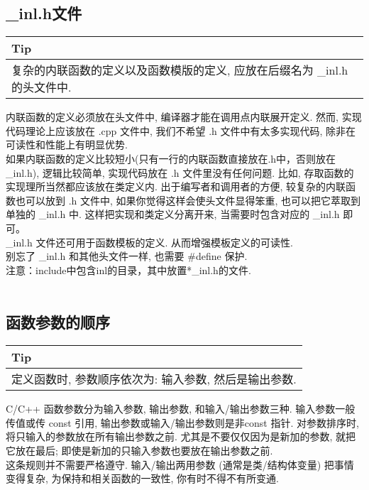 \documentclass[a4paper,11pt,CJK]{article}
\begin{document}
\begin{CJK}{UTF8}{gbsn}
\subsection{\_inl.h文件}
\begin{table}[htbp]
\flushleft
\begin{tabular}{p{400pt}}
\toprule
\rowcolor[gray]{.8} Tip \\
\midrule
复杂的内联函数的定义以及函数模版的定义, 应放在后缀名为 \_inl.h 的头文件中. \\
\bottomrule
\end{tabular}
\end{table}
内联函数的定义必须放在头文件中, 编译器才能在调用点内联展开定义. 然而, 实现代码理论上应该放在 .cpp 文件中, 我们不希望 .h 文件中有太多实现代码, 除非在可读性和性能上有明显优势. \\
\indent 如果内联函数的定义比较短小(只有一行的内联函数直接放在.h中，否则放在\_inl.h), 逻辑比较简单, 实现代码放在 .h 文件里没有任何问题. 比如, 存取函数的实现理所当然都应该放在类定义内. 出于编写者和调用者的方便, 较复杂的内联函数也可以放到 .h 文件中, 如果你觉得这样会使头文件显得笨重, 也可以把它萃取到单独的 \_inl.h 中. 这样把实现和类定义分离开来, 当需要时包含对应的 \_inl.h 即可。\\
\indent \_inl.h 文件还可用于函数模板的定义. 从而增强模板定义的可读性. \\
\indent 别忘了 \_inl.h 和其他头文件一样, 也需要 \#define 保护. \\
\indent 注意：include中包含inl的目录，其中放置*\_inl.h的文件.
\\
\\
\subsection{函数参数的顺序}
\begin{table}[htbp]
\flushleft
\begin{tabular}{p{400pt}}
\toprule
\rowcolor[gray]{.8} Tip \\
\midrule
定义函数时, 参数顺序依次为: 输入参数, 然后是输出参数. \\
\bottomrule
\end{tabular}
\end{table}
C/C++ 函数参数分为输入参数, 输出参数, 和输入/输出参数三种. 输入参数一般传值或传 const 引用, 输出参数或输入/输出参数则是非const 指针. 对参数排序时,
将只输入的参数放在所有输出参数之前. 尤其是不要仅仅因为是新加的参数, 就把它放在最后; 即使是新加的只输入参数也要放在输出参数之前. \\
\indent 这条规则并不需要严格遵守. 输入/输出两用参数 (通常是类/结构体变量) 把事情变得复杂, 为保持和相关函数的一致性, 你有时不得不有所变通. \\


\end{CJK}
\end{document}
